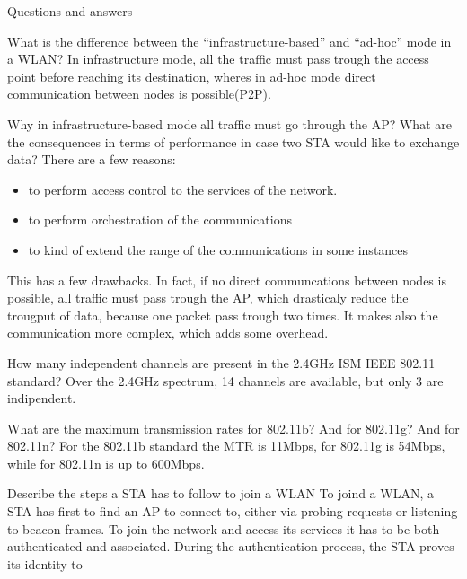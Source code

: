 \begin{section}{Questions and answers}
  \begin{subsubsection}{What is the difference between the
    “infrastructure-based” and “ad-hoc” mode in a WLAN?}
    In infrastructure mode, all the traffic must pass trough the access point before reaching its
    destination, wheres in ad-hoc mode direct communication between nodes is possible(P2P).
  \end{subsubsection}
  \begin{subsubsection}{Why in infrastructure-based mode all traffic must go
      through the AP? What are the consequences in terms of performance in case
    two STA would like to exchange data?}
    There are a few reasons:
    \begin{itemize}
      \item to perform access control to the services of the network.
      \item to perform orchestration of the communications
      \item to kind of extend the range of the communications in some instances
    \end{itemize}
    This has a few drawbacks. In fact, if no direct communcations between nodes is possible, all
    traffic must pass trough the AP, which drasticaly reduce the trougput of data, because one
    packet pass trough two times. It makes also the communication more complex, which adds some
    overhead.
  \end{subsubsection}
  \begin{subsubsection}{How many independent channels are present in the 2.4GHz
    ISM IEEE 802.11 standard?}
    Over the 2.4GHz spectrum, 14 channels are available, but only 3 are indipendent.
  \end{subsubsection}
  \begin{subsubsection}{What are the maximum transmission rates for 802.11b?
    And for 802.11g? And for 802.11n?}
    For the 802.11b standard the MTR is 11Mbps, for 802.11g is 54Mbps, while for 802.11n is up to
    600Mbps.
  \end{subsubsection}
  \begin{subsubsection}{Describe the steps a STA has to follow to join a WLAN}
    To joind a WLAN, a STA has first to find an AP to connect to, either via probing requests or
    listening to beacon frames. To join the network and access its services it has to be both
    authenticated and associated. During the authentication process, the STA proves its identity to

\end{subsubsection}
\end{section}
